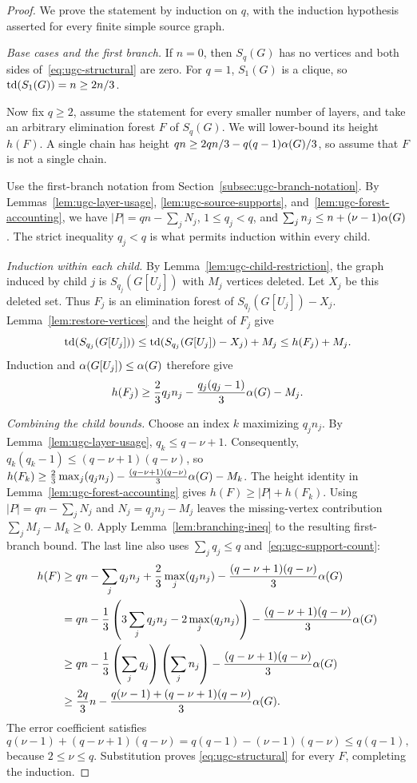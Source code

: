 \begin{proof}
We prove the statement by induction on $q$, with the induction
hypothesis asserted for every finite simple source graph.

\emph{Base cases and the first branch.}
If $n=0$, then $S_q(G)$ has no vertices and
both sides of~\eqref{eq:ugc-structural} are zero. For $q=1$,
$S_1(G)$ is a clique, so $\operatorname{td}(S_1(G))=n\geq2n/3$.

Now fix $q\geq2$, assume the statement for every smaller number of
layers, and take an arbitrary elimination forest $F$ of $S_q(G)$. We
will lower-bound its height $h(F)$. A single chain has height
$qn\geq2qn/3-q(q-1)\alpha(G)/3$, so assume that $F$ is not a
single chain.

Use the first-branch notation from
Section~\ref{subsec:ugc-branch-notation}. By
Lemmas~\ref{lem:ugc-layer-usage}, \ref{lem:ugc-source-supports},
and~\ref{lem:ugc-forest-accounting}, we have
$|P|=qn-\sum_jN_j$, $1\leq q_j<q$, and
$\sum_jn_j\leq n+(\nu-1)\alpha(G)$.
The strict inequality $q_j<q$ is what permits induction within every
child.

\emph{Induction within each child.}
By Lemma~\ref{lem:ugc-child-restriction}, the graph induced by
child $j$ is $S_{q_j}(G[U_j])$ with $M_j$ vertices deleted. Let $X_j$
be this deleted set. Thus $F_j$ is an elimination forest of
$S_{q_j}(G[U_j])-X_j$. Lemma~\ref{lem:restore-vertices} and the height
of $F_j$ give
\[
 \operatorname{td}(S_{q_j}(G[U_j]))
 \leq \operatorname{td}(S_{q_j}(G[U_j])-X_j)+M_j
 \leq h(F_j)+M_j.
\]
Induction and $\alpha(G[U_j])\leq\alpha(G)$ therefore give
\[
  h(F_j)\geq\frac{2}{3}q_jn_j-\frac{q_j(q_j-1)}3\alpha(G)-M_j.
\]

\emph{Combining the child bounds.}
Choose an index $k$ maximizing $q_jn_j$. By
Lemma~\ref{lem:ugc-layer-usage}, $q_k\leq q-\nu+1$. Consequently,
$q_k(q_k-1)\leq(q-\nu+1)(q-\nu)$, so
$h(F_k)\geq\frac23\max_j(q_jn_j)
-\frac{(q-\nu+1)(q-\nu)}3\alpha(G)-M_k$.
The height identity in Lemma~\ref{lem:ugc-forest-accounting} gives
$h(F)\geq |P|+h(F_k)$. Using $|P|=qn-\sum_jN_j$ and
$N_j=q_jn_j-M_j$ leaves the missing-vertex contribution
$\sum_jM_j-M_k\geq0$. Apply Lemma~\ref{lem:branching-ineq} to
the resulting first-branch bound. The last line also uses
$\sum_jq_j\leq q$ and~\eqref{eq:ugc-support-count}:
\[
\begin{aligned}
 h(F)&\geq qn-\sum_jq_jn_j+\frac23\max_j(q_jn_j)
       -\frac{(q-\nu+1)(q-\nu)}3\alpha(G)\\
 &=qn-\frac13\left(3\sum_jq_jn_j-2\max_j(q_jn_j)\right)
       -\frac{(q-\nu+1)(q-\nu)}3\alpha(G)\\
 &\geq qn-\frac13\left(\sum_jq_j\right)\left(\sum_jn_j\right)
       -\frac{(q-\nu+1)(q-\nu)}3\alpha(G)\\
 &\geq\frac{2q}{3}n-
    \frac{q(\nu-1)+(q-\nu+1)(q-\nu)}3\alpha(G).
\end{aligned}
\]
The error coefficient satisfies
\[
 q(\nu-1)+(q-\nu+1)(q-\nu)
 =q(q-1)-(\nu-1)(q-\nu)\leq q(q-1),
\]
because $2\leq \nu\leq q$. Substitution proves
\eqref{eq:ugc-structural} for every $F$, completing the induction.
\end{proof}

